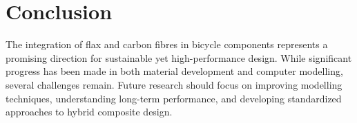 \documentclass[11pt,twocolumn]{article}
\begin{document}
\section{Conclusion}
The integration of flax and carbon fibres in bicycle components represents a promising direction for sustainable yet high-performance design. While significant progress has been made in both material development and computer modelling, several challenges remain. Future research should focus on improving modelling techniques, understanding long-term performance, and developing standardized approaches to hybrid composite design.



\end{document}
